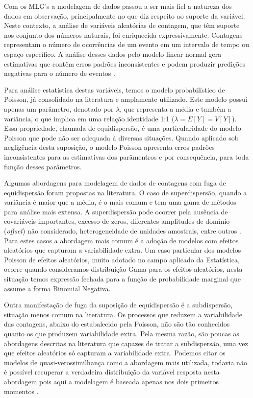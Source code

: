 \documentclass[
12pt,				%
openright,			%
oneside,			%
a4paper,			%
english,			%
brazil,				%
]{abntex2}
\begin{document}
Com os MLG's a modelagem de dados passou a ser mais
fiel a natureza dos dados em observação, principalmente no que diz
respeito ao suporte da variável. Neste contexto, a análise de
variáveis aleatórias de contagem, que têm suporte nos conjunto dos
números naturais, foi enriquecida expressivamente. Contagens representam
o número de ocorrências de um evento em um intervalo de tempo ou espaço
específico. A análise desses dados pelo modelo
linear normal gera estimativas que contêm erros padrões inconsistentes e
podem produzir predições negativas para o número de eventos
\cite{King1989}.

Para análise estatística destas variáveis, temos o modelo probabilístico
de Poisson, já consolidado na literatura e amplamente
utilizado. Este modelo possui apenas um parâmetro, denotado por
$\lambda$, que representa a média e também a variância, o que implica em
uma relação identidade 1:1 ($\lambda = E[Y] = V[Y]$). Essa propriedade,
chamada de 
equidispersão, é uma particularidade do modelo Poisson que pode não ser
adequada à diversas situações. Quando aplicado sob negligência desta
suposição, o modelo Poisson apresenta erros padrões inconsistentes para
as estimativas dos parâmentros e por consequência, para toda função
desses parâmetros.

Algumas abordagens para modelagem de dados de contagens com fuga de
equidispersão foram propostas na literatura. O caso de superdispersão,
quando a variância é maior que a média, é o mais comum e tem uma gama de
métodos para análise mais extensa. A superdispersão pode ocorrer pela
ausência de covariáveis importantes, excesso de zeros, diferentes
amplitudes de domínio (\textit{offset}) não considerado, heterogeneidade
de unidades amostrais, entre
outros \cite{RibeiroJr2012}. Para estes casos a abordagem mais comum é a
adoção de modelos com efeitos aleatórios que capturam a variabilidade
extra. Um caso particular dos modelos Poisson de efeitos aleatórios,
muito adotado no campo aplicado da Estatística, ocorre quando
consideramos distribuição Gama para os efeitos aleatórios, nesta
situação temos expressão fechada para a função de probabilidade marginal
que assume a forma Binomial Negativa.

Outra manifestação de
fuga da suposição de equidispersão é a subdispersão, situação menos
comum na literatura. Os processos
que reduzem a variabilidade das contagens, abaixo do estabalecido pela
Poisson, não são tão conhecidos quanto os
que produzem variabilidade extra. Pela mesma razão, são poucas as
abordagens descritas na literatura que 
capazes de tratar a
subdispersão, uma vez que efeitos aleatórios só capturam a variabilidade
extra. Podemos citar os modelos de quasi-verossimilhança como a 
abordagem mais utilizada, todavia não é possível recuperar a verdadeira
distribuição da variável resposta nesta abordagem pois aqui a
modelagem é baseada apenas nos dois primeiros momentos \cite{Paula2013}. 
\end{document}
